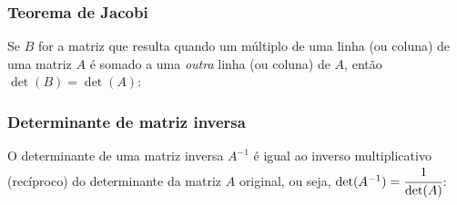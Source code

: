\documentclass[pdftex, brazil, aspectratio=169]{beamer}
\begin{document}
\begin{frame}[t]
  \frametitle{Teorema de Jacobi}
  Se $B$ for a matriz que resulta quando um múltiplo de uma linha (ou coluna) de
  uma matriz $A$ é somado a uma \emph{outra} linha (ou coluna) de $A$, então
  $\det(B) = \det(A)$:


\end{frame}

\begin{frame}[t]
  \frametitle{Determinante de matriz inversa}
  O determinante de uma matriz inversa $A^{-1}$ é igual ao inverso
  multiplicativo (recíproco) do determinante da matriz $A$ original, ou seja,
  $\det(A^{-1}) = \cfrac{1}{\det(A)}$:

\end{frame}
\end{document}
